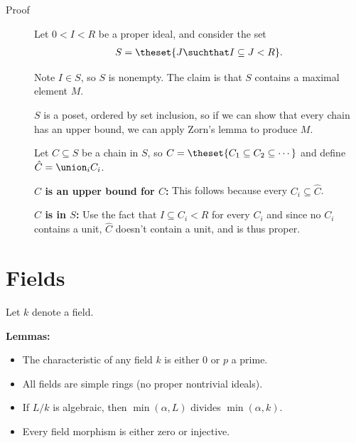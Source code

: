 \begin{description}
\item[Proof]
Let \(0 < I < R\) be a proper ideal, and consider the set
\begin{align*}
S = \theset{J \suchthat I   \subseteq J < R}
.\end{align*}

Note \(I\in S\), so \(S\) is nonempty. The claim is that \(S\) contains
a maximal element \(M\).

\(S\) is a poset, ordered by set inclusion, so if we can show that every
chain has an upper bound, we can apply Zorn's lemma to produce \(M\).

Let \(C \subseteq S\) be a chain in \(S\), so
\(C = \theset{C_1 \subseteq C_2 \subseteq \cdots}\) and define
\(\hat C = \union_i C_i\).

\textbf{\(\hat C\) is an upper bound for \(C\):} This follows because
every \(C_i \subseteq \hat C\).

\textbf{\(\hat C\) is in \(S\):} Use the fact that
\(I \subseteq C_i < R\) for every \(C_i\) and since no \(C_i\) contains
a unit, \(\hat C\) doesn't contain a unit, and is thus proper.
\end{description}

\hypertarget{fields}{%
\section{Fields}\label{fields}}

Let \(k\) denote a field.

\textbf{Lemmas:}

\begin{itemize}
\tightlist
\item
  The characteristic of any field \(k\) is either 0 or \(p\) a prime.
\item
  All fields are simple rings (no proper nontrivial ideals).
\item
  If \(L/k\) is algebraic, then \(\min(\alpha, L)\) divides
  \(\min(\alpha, k)\).
\item
  Every field morphism is either zero or injective.
\end{itemize}

